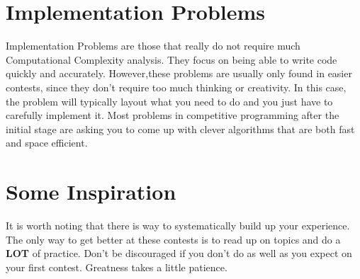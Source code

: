 \documentclass{article}
\begin{document}
\section{Implementation Problems}

Implementation Problems are those that really do not require much Computational Complexity analysis. They focus on being able to write code quickly and accurately. However,these problems are usually only found in easier contests, since they don’t require too much thinking or creativity. In this case, the problem will typically layout what you need to do and you just have to carefully implement it. Most problems in competitive programming after the initial stage are asking you to come up with clever algorithms that are both fast and space efficient.

\section{Some Inspiration}
It is worth noting that there is way to systematically build up your experience. The only way to get better at these contests is to read up on topics and do a \textbf{LOT} of practice. Don't be discouraged if you don't do as well as you expect on your first contest. Greatness takes a little patience.
\end{document}
